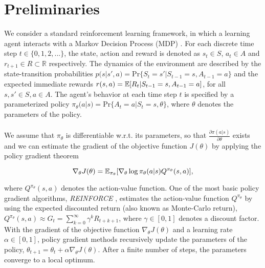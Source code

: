 \section{Preliminaries}
\label{sec:preliminaries}

We consider a standard reinforcement learning framework, in which a learning agent interacts with a Markov Decision Process (MDP) \citep{howard1960dynamic, sutton2018reinforcement}. For each discrete time step $t \in \{0,1,2,...\}$, the state, action and reward is denoted as $s_t \in \mathit{S}$, $a_t \in A$ and $r_{t+1} \in \mathit{R} \subset \mathbb{R}$ respectively. The dynamics of the environment are described by the state-transition probabilities $p(s|s', a) = \text{Pr}\{S_t = s' | S_{t-1} = s, A_{t-1} = a\}$ and the expected immediate rewards $r(s, a) = \operatorname{\mathbb{E}}[R_t | S_{t-1} = s, A_{t-1} = a]$, for all $s, s' \in S, a \in A$. The agent's behavior at each time step $t$ is specified by a parameterized policy $\pi_{\theta}(a|s) = \text{Pr}\{A_t = a | S_{t} = s, \theta\}$, where $\theta$ denotes the parameters of the policy. 
\\\\
We assume that $\pi_\theta$ is differentiable w.r.t. its parameters, so that $\tfrac{\partial\pi(a|s)}{\partial \theta}$ exists and we can estimate the gradient of the objective function $J(\theta)$ by applying the policy gradient theorem \citep{sutton2000policy}

\begin{equation}
\label{equ:policygradienttheorem}
\nabla_{\theta}J(\theta)=\operatorname{\mathbb{E}}_{\pi_{\theta}}[\nabla_{\theta}\log\pi_{\theta}(a|s) Q^{\pi_{\theta}}(s, a)],
\end{equation}

\noindent where $Q^{\pi_{\theta}}(s, a)$ denotes the action-value function. One of the most basic policy gradient algorithms, \textit{REINFORCE} \citep{williams1992simple}, estimates the action-value function $Q^{\pi_{\theta}}$ by using the expected discounted return (also known as Monte-Carlo return), \(Q^{\pi_\theta}(s, a) \approx \mathit{G}_t = \sum_{k=0}^{\infty}\gamma^k R_{t+k+1}\),
where $\gamma \in [0, 1]$ denotes a discount factor. With the gradient of the objective function $\nabla_{\theta}J(\theta)$ and a learning rate $\alpha \in \left[0,1\right]$, policy gradient methods recursively update the parameters of the policy, $\theta_{t+1} = \theta_t + \alpha \nabla_{\theta} J(\theta)$. After a finite number of steps, the parameters converge to a local optimum. 

